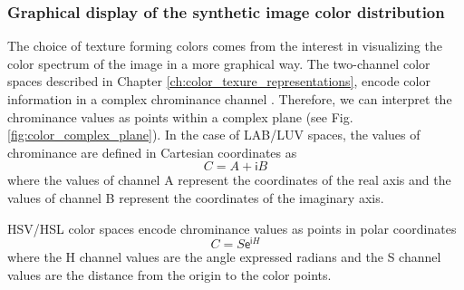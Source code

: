 
\subsubsection{Graphical display of the synthetic image color distribution}
The choice of texture forming colors comes from the interest in visualizing the color spectrum of the image in a more graphical way. The two-channel color spaces described in Chapter \ref{ch:color_texure_representations}, encode color information in a complex chrominance channel . Therefore, we can interpret the chrominance values as points within a complex plane (see Fig. \ref{fig:color_complex_plane}). In the case of LAB/LUV spaces, the values of chrominance are defined in Cartesian coordinates as 
\begin{equation}\label{eq:chrominance_lab2}
    C = A + \mathsf{i}B
\end{equation}
where the values of channel A represent the coordinates of the real axis and the values of channel B represent the coordinates of the imaginary axis. 

HSV/HSL color spaces encode chrominance values as points in polar coordinates 
\begin{equation}\label{eq:chrominance_hsv2}
    C = S \mathsf{e}^{\mathsf{i}H}
\end{equation}
where the H channel values are the angle expressed radians and the S channel values are the distance from the origin to the color points. 

